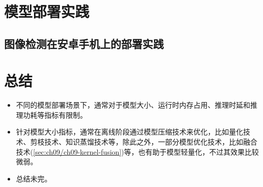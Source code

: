 \section{模型部署实践}
\subsection{图像检测在安卓手机上的部署实践}

\section{总结}
\begin{itemize}
    \item 不同的模型部署场景下，通常对于模型大小、运行时内存占用、推理时延和推理功耗等指标有限制。
    \item 针对模型大小指标，通常在离线阶段通过模型压缩技术来优化，比如量化技术、剪枝技术、知识蒸馏技术等，除此之外，一部分模型优化技术，比如融合技术(\ref{sec:ch09/ch09-kernel-fusion})等，也有助于模型轻量化，不过其效果比较微弱。
    \item 总结未完。
\end{itemize}


